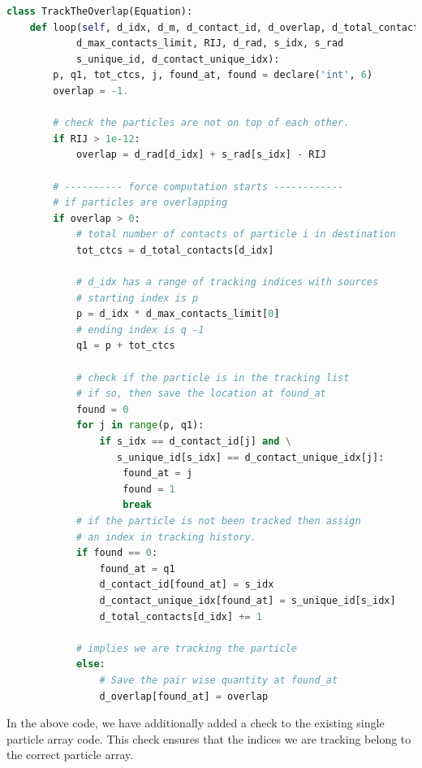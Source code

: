 \begin{lstlisting}[label={contact:equations},frame=lines,language=Python,upquote=True]
class TrackTheOverlap(Equation):
    def loop(self, d_idx, d_m, d_contact_id, d_overlap, d_total_contacts,
            d_max_contacts_limit, RIJ, d_rad, s_idx, s_rad
            s_unique_id, d_contact_unique_idx):
        p, q1, tot_ctcs, j, found_at, found = declare('int', 6)
        overlap = -1.

        # check the particles are not on top of each other.
        if RIJ > 1e-12:
            overlap = d_rad[d_idx] + s_rad[s_idx] - RIJ

        # ---------- force computation starts ------------
        # if particles are overlapping
        if overlap > 0:
            # total number of contacts of particle i in destination
            tot_ctcs = d_total_contacts[d_idx]

            # d_idx has a range of tracking indices with sources
            # starting index is p
            p = d_idx * d_max_contacts_limit[0]
            # ending index is q -1
            q1 = p + tot_ctcs

            # check if the particle is in the tracking list
            # if so, then save the location at found_at
            found = 0
            for j in range(p, q1):
                if s_idx == d_contact_id[j] and \
                   s_unique_id[s_idx] == d_contact_unique_idx[j]:
                    found_at = j
                    found = 1
                    break
            # if the particle is not been tracked then assign
            # an index in tracking history.
            if found == 0:
                found_at = q1
                d_contact_id[found_at] = s_idx
                d_contact_unique_idx[found_at] = s_unique_id[s_idx]
                d_total_contacts[d_idx] += 1

            # implies we are tracking the particle
            else:
                # Save the pair wise quantity at found_at
                d_overlap[found_at] = overlap
\end{lstlisting}
In the above code, we have additionally added a check to the existing single
particle array code. This check ensures that the indices we are tracking belong
to the correct particle array.



